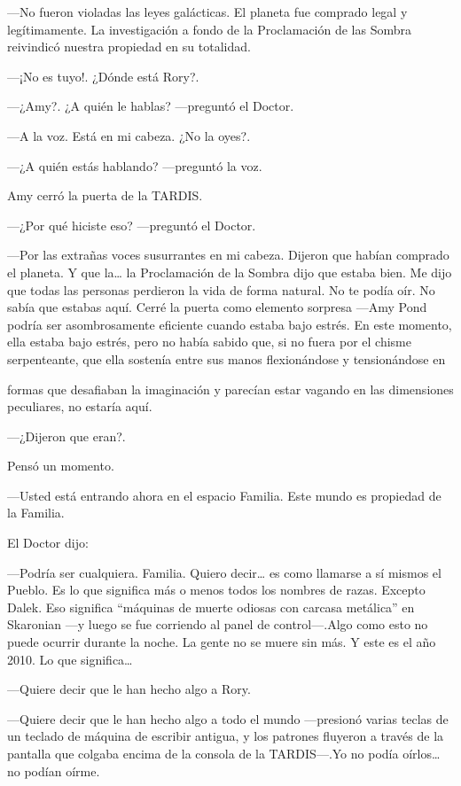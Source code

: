 ---No fueron violadas las leyes galácticas. El planeta fue comprado legal y legítimamente. La investigación a fondo de la Proclamación de las Sombra reivindicó nuestra propiedad en su totalidad.

---¡No es tuyo!. ¿Dónde está Rory?.

---¿Amy?. ¿A quién le hablas? ---preguntó el Doctor.

---A la voz. Está en mi cabeza. ¿No la oyes?.

---¿A quién estás hablando? ---preguntó la voz.

Amy cerró la puerta de la TARDIS.

---¿Por qué hiciste eso? ---preguntó el Doctor.

---Por las extrañas voces susurrantes en mi cabeza. Dijeron que habían comprado el planeta. Y que la\ldots{} la Proclamación de la Sombra dijo que estaba bien. Me dijo que todas las personas perdieron la vida de forma natural. No te podía oír. No sabía que estabas aquí. Cerré la puerta como elemento sorpresa ---Amy Pond podría ser asombrosamente eficiente cuando estaba bajo estrés. En este momento, ella estaba bajo estrés, pero no había sabido que, si no fuera por el chisme serpenteante, que ella sostenía entre sus manos flexionándose y tensionándose en

formas que desafiaban la imaginación y parecían estar vagando en las dimensiones peculiares, no estaría aquí.

---¿Dijeron que eran?.

Pensó un momento.

---Usted está entrando ahora en el espacio Familia. Este mundo es propiedad de la Familia.

El Doctor dijo:

---Podría ser cualquiera. Familia. Quiero decir\ldots{} es como llamarse a sí mismos el Pueblo. Es lo que significa más o menos todos los nombres de razas. Excepto Dalek. Eso significa ``máquinas de muerte odiosas con carcasa metálica'' en Skaronian ---y luego se fue corriendo al panel de control---.Algo como esto no puede ocurrir durante la noche. La gente no se muere sin más. Y este es el año 2010. Lo que significa\ldots{}

---Quiere decir que le han hecho algo a Rory.

---Quiere decir que le han hecho algo a todo el mundo ---presionó varias teclas de un teclado de máquina de escribir antigua, y los patrones fluyeron a través de la pantalla que colgaba encima de la consola de la TARDIS---.Yo no podía oírlos\ldots{} no podían oírme.

